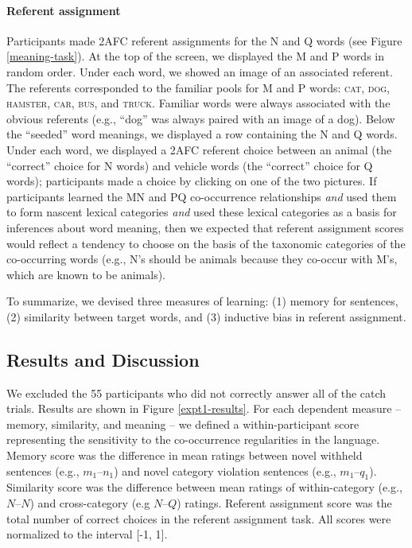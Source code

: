 \documentclass[man,floatsintext]{apa6}
\begin{document}
\paragraph{Referent assignment}
Participants made 2AFC referent assignments for the N and Q words (see Figure \ref{meaning-task}). At the top of the screen, we displayed the M and P words in random order. Under each word, we showed an image of an associated referent. The referents corresponded to the familiar pools for M and P words: \textsc{cat}, \textsc{dog}, \textsc{hamster}, \textsc{car}, \textsc{bus}, and \textsc{truck}. Familiar words were always associated with the obvious referents (e.g., ``dog'' was always paired with an image of a dog). Below the ``seeded'' word meanings, we displayed a row containing the N and Q words. Under each word, we displayed a 2AFC referent choice between an animal (the ``correct'' choice for N words) and vehicle words (the ``correct'' choice for Q words); participants made a choice by clicking on one of the two pictures. If participants learned the MN and PQ co-occurrence relationships \emph{and} used them to form nascent lexical categories \emph{and} used these lexical categories as a basis for inferences about word meaning, then we expected that referent assignment scores would reflect a tendency to choose on the basis of the taxonomic categories of the co-occurring words (e.g., N's should be animals because they co-occur with M's, which are known to be animals).

To summarize, we devised three measures of learning: (1) memory for sentences, (2) similarity between target words, and (3) inductive bias in referent assignment.

\subsection{Results and Discussion}
We excluded the 55 participants who did not correctly answer all of the catch trials. Results are shown in Figure \ref{expt1-results}. For each dependent measure -- memory, similarity, and meaning -- we defined a within-participant score representing the sensitivity to the co-occurrence regularities in the language. Memory score was the difference in mean ratings between novel withheld sentences (e.g., $m_1$--$n_1$) and novel category violation sentences (e.g., $m_1$--$q_1$). Similarity score was the difference between mean ratings of within-category (e.g., $N$--$N$) and cross-category (e.g $N$--$Q$) ratings. Referent assignment score was the total number of correct choices in the referent assignment task. All scores were normalized to the interval [-1, 1].
\end{document}
